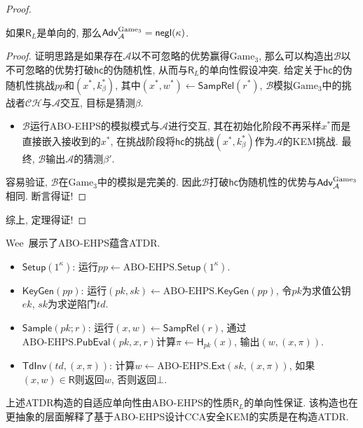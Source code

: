 \begin{proof}
\begin{claim}
如果$\mathsf{R}_L$是单向的, 那么$\mathsf{Adv}_\mathcal{A}^{\text{Game}_3} = \mathsf{negl}(\kappa)$. 
\end{claim}

\begin{proof}
证明思路是如果存在$\mathcal{A}$以不可忽略的优势赢得$\text{Game}_3$, 
那么可以构造出$\mathcal{B}$以不可忽略的优势打破$\mathsf{hc}$的伪随机性, 从而与$\mathsf{R}_L$的单向性假设冲突. 
给定关于$\mathsf{hc}$的伪随机性挑战$pp$和$(x^*, k_\beta^*)$, 其中$(x^*, w^*) \leftarrow \mathsf{SampRel}(r^*)$, 
$\mathcal{B}$模拟$\text{Game}_3$中的挑战者$\mathcal{CH}$与$\mathcal{A}$交互, 目标是猜测$\beta$. 
\begin{itemize}
    \item $\mathcal{B}$运行ABO-EHPS的模拟模式与$\mathcal{A}$进行交互, 其在初始化阶段不再采样$x^*$而是直接嵌入接收到的$x^*$, 
    	在挑战阶段将$\mathsf{hc}$的挑战$(x^*, k_\beta^*)$作为$\mathcal{A}$的KEM挑战. 
    	最终, $\mathcal{B}$输出$\mathcal{A}$的猜测$\beta'$. 
\end{itemize} 
容易验证, $\mathcal{B}$在$\text{Game}_3$中的模拟是完美的. 因此$\mathcal{B}$打破$\mathsf{hc}$伪随机性的优势与$\mathsf{Adv}_\mathcal{A}^{\text{Game}_3}$相同. 
断言得证! 
\end{proof}
综上, 定理得证!
\end{proof}

Wee~\cite{Wee-CRYPTO-2010}展示了ABO-EHPS蕴含ATDR.
\begin{construction}
\begin{itemize}
\item $\mathsf{Setup}(1^\kappa)$: 运行$pp \leftarrow \text{ABO-EHPS}.\mathsf{Setup}(1^\kappa)$. 

\item $\mathsf{KeyGen}(pp)$: 运行$(pk, sk) \leftarrow \text{ABO-EHPS}.\mathsf{KeyGen}(pp)$, 
	令$pk$为求值公钥$ek$, $sk$为求逆陷门$td$. 

\item $\mathsf{Sample}(pk; r)$: 运行$(x, w) \leftarrow \mathsf{SampRel}(r)$, 
   	通过$\text{ABO-EHPS}.\mathsf{PubEval}(pk, x, r)$计算$\pi \leftarrow \mathsf{H}_{pk}(x)$, 输出$(w, (x, \pi))$.  

\item $\mathsf{TdInv}(td, (x, \pi))$: 计算$w \leftarrow \text{ABO-EHPS}.\mathsf{Ext}(sk, (x, \pi))$,  
    如果$(x, w) \in \mathsf{R}$则返回$w$, 否则返回$\bot$.
\end{itemize}
\end{construction}
上述ATDR构造的自适应单向性由ABO-EHPS的性质$\mathsf{R}_L$的单向性保证. 
该构造也在更抽象的层面解释了基于ABO-EHPS设计CCA安全KEM的实质是在构造ATDR.  


